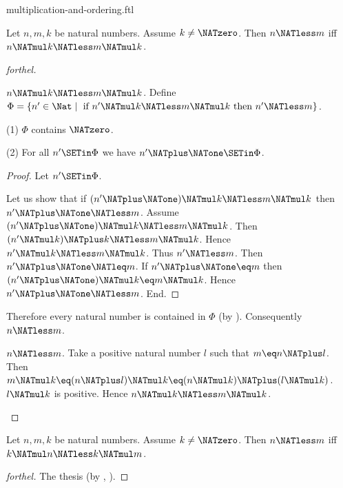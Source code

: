 \documentclass{stex}
\begin{document}
\begin{smodule}{multiplication-and-ordering.ftl}

\begin{proposition}[forthel,id=ARITHMETIC_06_8817333933965312]
  Let $n, m, k$ be natural numbers.
  Assume $k \neq \NATzero$.
  Then $n \NATless m$ iff $n \NATmul k \NATless m \NATmul k$.
\end{proposition}
\begin{proof}[forthel]
  \begin{case}{$n \NATmul k \NATless m \NATmul k$.}
    Define $\Phi = \{ n' \in \Nat \mid\text{ if }n' \NATmul k \NATless m \NATmul k\text{ then }n' \NATless m \}$.

    (1) $\Phi$ contains $\NATzero$.

    (2) For all $n' \SETin \Phi$ we have $n' \NATplus \NATone \SETin \Phi$.
    \begin{proof}
      Let $n' \SETin \Phi$.

      Let us show that if $(n' \NATplus \NATone) \NATmul k \NATless m \NATmul k$ then $n' \NATplus \NATone \NATless m$.
        Assume $(n' \NATplus \NATone) \NATmul k \NATless m \NATmul k$.
        Then $(n' \NATmul k) \NATplus k \NATless m \NATmul k$.
        Hence $n' \NATmul k \NATless m \NATmul k$.
        Thus $n' \NATless m$.
        Then $n' \NATplus \NATone \NATleq m$.
        If $n' \NATplus \NATone \eq m$ then $(n' \NATplus \NATone) \NATmul k \eq m \NATmul k$.
        Hence $n' \NATplus \NATone \NATless m$.
      End.
    \end{proof}

    Therefore every natural number is contained in $\Phi$ (by ).
    Consequently $n \NATless m$.
  \end{case}

  \begin{case}{$n \NATless m$.}
    Take a positive natural number $l$ such that $m \eq n \NATplus l$.
    Then $m \NATmul k \eq (n \NATplus l) \NATmul k \eq (n \NATmul k) \NATplus (l \NATmul k)$.
    $l \NATmul k$ is positive.
    Hence $n \NATmul k \NATless m \NATmul k$.
  \end{case}
\end{proof}

\begin{corollary}[forthel,id=ARITHMETIC_06_5048640368279552]
  Let $n, m, k$ be natural numbers.
  Assume $k \neq \NATzero$.
  Then $n \NATless m$ iff $k \NATmul n \NATless k \NATmul m$.
\end{corollary}
\begin{proof}[forthel]
  The thesis (by , ).
\end{proof}


\end{smodule}
\end{document}
